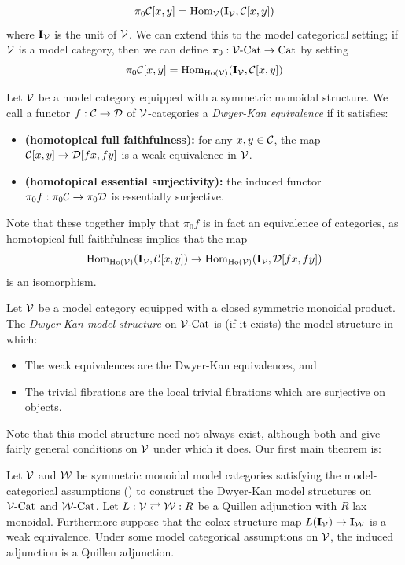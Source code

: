\documentclass[12pt]{amsart}
\begin{document}
$$\pi_0\mathcal{C}[x,y] = \mathrm{Hom}_\mathcal{V}(\mathbf{I}_\mathcal{V}, \mathcal{C}[x,y])$$
where $\mathbf{I}_\mathcal{V}$ is the unit of $\mathcal{V}$. 
We can extend this to the model categorical setting; if $\mathcal{V}$ is a model category, then we can define $\pi_0: \mathcal{V}\text{-}\mathrm{Cat} \to \mathrm{Cat}$ by setting 
$$\pi_0\mathcal{C}[x,y] = \mathrm{Hom}_{\mathrm{Ho}(\mathcal{V})}(\mathbf{I}_\mathcal{V}, \mathcal{C}[x,y])$$
\begin{definition}
	Let $\mathcal{V}$ be a model category equipped with a symmetric monoidal structure. We call a functor $f: \mathcal{C} \to \mathcal{D}$ of $\mathcal{V}$-categories a \emph{Dwyer-Kan equivalence} if it satisfies:
	\begin{itemize}
		\item \textbf{(homotopical full faithfulness):} for any $x,y \in \mathcal{C}$, the map $\mathcal{C}[x,y] \to \mathcal{D}[fx,fy]$ is a weak equivalence in $\mathcal{V}$.
		\item \textbf{(homotopical essential surjectivity):} the induced functor $\pi_0f:\pi_0\mathcal{C} \to \pi_0\mathcal{D}$ is essentially surjective. 
	\end{itemize} 
	Note that these together imply that $\pi_0f$ is in fact an equivalence of categories, as homotopical full faithfulness implies that the map 
	$$\mathrm{Hom}_{\mathrm{Ho}(\mathcal{V})}(\mathbf{I}_\mathcal{V}, \mathcal{C}[x,y]) \to \mathrm{Hom}_{\mathrm{Ho}(\mathcal{V})}(\mathbf{I}_\mathcal{V}, \mathcal{D}[fx,fy])$$ 
	is an isomorphism. 
\end{definition}
\begin{definition}
	Let $\mathcal{V}$ be a model category equipped with a closed symmetric monoidal product. The \emph{Dwyer-Kan model structure} on $\mathcal{V}\text{-}\mathrm{Cat}$ is (if it exists) the model structure in which:
	\begin{itemize}
		\item The weak equivalences are the Dwyer-Kan equivalences, and
		\item The trivial fibrations are the local trivial fibrations which are surjective on objects.
	\end{itemize}
\end{definition}
Note that this model structure need not always exist, although both \cite{Muro2012} and \cite{BergerMoerdijk2012} give fairly general conditions on $\mathcal{V}$ under which it does.
Our first main theorem is:
\begin{alphatheorem}\label{alphathm:complicated}
	Let $\mathcal{V}$ and $\mathcal{W}$ be symmetric monoidal model categories satisfying the model-categorical assumptions (\cite{Muro2012}) to construct the Dwyer-Kan model structures on $\mathcal{V}\text{-}\mathrm{Cat}$ and $\mathcal{W}\text{-}\mathrm{Cat}$.
	Let $L: \mathcal{V} \rightleftarrows \mathcal{W}: R$ be a Quillen adjunction with $R$ lax monoidal.
	Furthermore suppose that the colax structure map $L(\mathbf{I}_\mathcal{V}) \to \mathbf{I}_\mathcal{W}$ is a weak equivalence.
	Under some model categorical assumptions on $\mathcal{V}$, the induced adjunction
	is a Quillen adjunction.
\end{alphatheorem}
\end{document}
